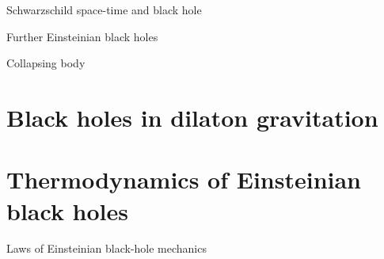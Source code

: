 \begin{nameddef}{Schwarzschild space-time and black hole}
\end{nameddef}



\begin{nameddef}{Further Einsteinian black holes}

\end{nameddef}



\begin{nameddef}{Collapsing body}

\end{nameddef}


\section{Black holes in dilaton gravitation}

\section{Thermodynamics of Einsteinian black holes}

\begin{nameddef}{Laws of Einsteinian black-hole mechanics}

\end{nameddef}


